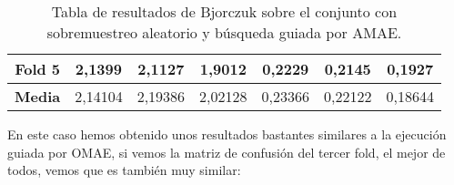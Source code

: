 \begin{table}[H]
{\begin{tabular}{|ccccccc|}
\multicolumn{1}{|c|}{\textbf{Fold 5}}            & \multicolumn{1}{c|}{2,1399}            & \multicolumn{1}{c|}{2,1127}              & \multicolumn{1}{c|}{1,9012}          & \multicolumn{1}{c|}{0,2229}            & \multicolumn{1}{c|}{0,2145}              & 0,1927          \\ \hline
\multicolumn{1}{|c|}{\textbf{Media}}             & \multicolumn{1}{c|}{2,14104}           & \multicolumn{1}{c|}{2,19386}             & \multicolumn{1}{c|}{2,02128}         & \multicolumn{1}{c|}{0,23366}           & \multicolumn{1}{c|}{0,22122}             & 0,18644         \\ \hline
\end{tabular}%
}
\caption{Tabla de resultados de Bjorczuk sobre el conjunto con sobremuestreo aleatorio y búsqueda guiada por AMAE.}\label{tablaBJORCZUKconAMAE}
\end{table}


En este caso hemos obtenido unos resultados bastantes similares a la ejecución guiada por OMAE, si vemos la matriz de confusión del tercer fold, el mejor de todos, vemos que es también muy similar:



